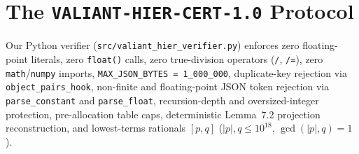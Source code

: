 \documentclass[10pt,twocolumn]{article}
\begin{document}
\section{The \texttt{VALIANT-HIER-CERT-1.0} Protocol}
{\raggedright
Our Python verifier (\texttt{src/valiant\_hier\_verifier.py}) enforces zero floating-point literals, zero \texttt{float()} calls, zero true-division operators (\texttt{/}, \texttt{/=}), zero \texttt{math}/\texttt{numpy} imports, \texttt{MAX\_JSON\_BYTES = 1\_000\_000}, duplicate-key rejection via \texttt{object\_pairs\_hook}, non-finite and floating-point JSON token rejection via \texttt{parse\_constant} and \texttt{parse\_float}, recursion-depth and oversized-integer protection, pre-allocation table caps, deterministic Lemma~7.2 projection reconstruction, and lowest-terms rationals $[p,q]$ ($|p|,q\le 10^{18}$, $\gcd(|p|,q)=1$).

}
\end{document}
